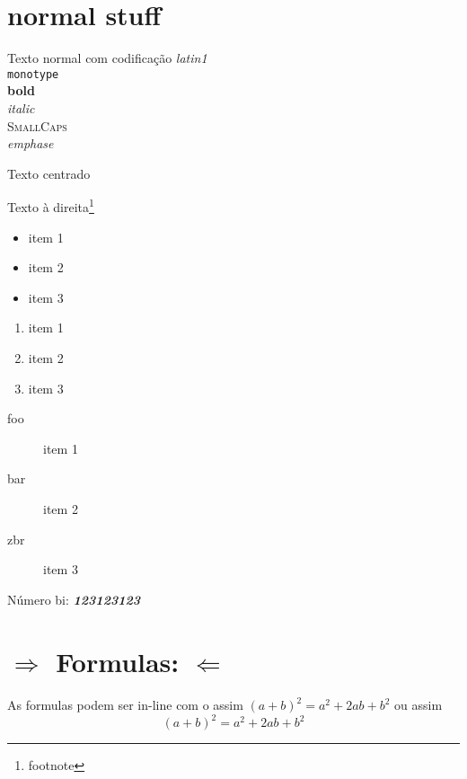 \documentclass{article}
\newcommand{\bi}[1]{\textbf{\textit{#1}}}
\newenvironment{realce}{$\Rightarrow$}{$\Leftarrow$}
\begin{document}
  \section{normal stuff}

  Texto normal com codificação \emph{latin1} \\
  \texttt{monotype} \\
  \textbf{bold} \\
  \textit{italic} \\
  \textsc{SmallCaps} \\
  \emph{emphase} \\

  \begin{center}
    Texto centrado
  \end{center}

  \begin{flushright}
    Texto à direita\footnote{footnote}
  \end{flushright}

  \begin{itemize}
    \item item 1
    \item item 2
    \item item 3
  \end{itemize}

  \begin{enumerate}
    \item item 1
    \item item 2
    \item item 3
  \end{enumerate}

  \begin{description}
    \item[foo] item 1
    \item[bar] item 2
    \item[zbr] item 3
  \end{description}

  Número bi: \bi{123123123}

  \clearpage{}

  \section{%
    \begin{realce}
      Formulas:
    \end{realce}
  }

  \paragraph{}
  As formulas podem ser in-line com o assim $ {(a + b)}^2 = a^2 + 2ab + b^2 $ ou assim
  \[ {(a + b)}^2 = a^2 + 2ab + b^2 \]
\end{document}
